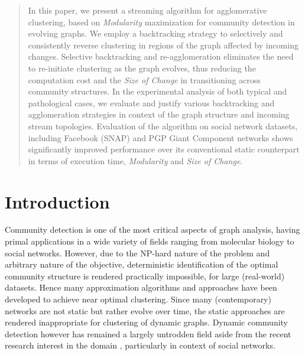 \documentclass[conference]{IEEEtran}
\begin{document}




\maketitle
\begin{abstract}
In this paper, we present a streaming algorithm for agglomerative clustering, 
based on \emph{Modularity} maximization for community detection in evolving 
graphs. We employ a backtracking strategy to selectively and consistently 
reverse clustering in regions of the graph affected by incoming changes. 
Selective backtracking and re-agglomeration eliminates the need to re-initiate 
clustering as the graph evolves, thus reducing the computation cost and the 
\emph{Size of Change} in transitioning across community structures. In the 
experimental analysis of both typical and pathological cases, we evaluate and 
justify various backtracking and agglomeration strategies in context of the 
graph structure and incoming stream topologies. Evaluation of the algorithm on 
social network datasets, including Facebook (SNAP) and PGP Giant Component 
networks shows significantly improved performance over its 
conventional static counterpart in terms of execution time, \emph{Modularity} 
and \emph{Size of Change}.
\end{abstract}





%
\IEEEpeerreviewmaketitle



\section{Introduction}
Community detection is one of the most critical aspects of
graph analysis, having primal applications in a wide variety of fields ranging
from molecular biology to social networks. However, due to the NP-hard nature
of the problem \cite{for} and arbitrary nature of the objective, deterministic
identification of the optimal community structure is rendered practically 
impossible, for large (real-world) datasets. Hence many approximation
algorithms and approaches have been developed to achieve near optimal
clustering. Since many (contemporary) networks are 
not static but rather evolve over time, the static approaches are rendered 
inappropriate for clustering of dynamic graphs. Dynamic community detection 
however has remained a largely untrodden field aside from the recent research 
 interest in the domain \cite{gor, ngu, hop, rie}, particularly in context of 
social networks.
\end{document}
